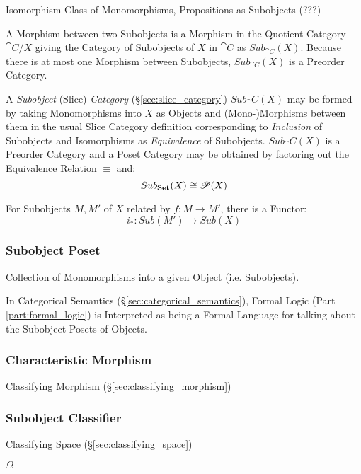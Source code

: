 Isomorphism Class of Monomorphisms, Propositions as Subobjects (???)

A Morphism between two Subobjects is a Morphism in the Quotient
Category $\cat{C}/X$ giving the Category of Subobjects of $X$ in
$\cat{C}$ as $Sub_{\cat{C}}(X)$. Because there is at most one
Morphism between Subobjects, $Sub_{\cat{C}}(X)$ is a Preorder
Category.

A \emph{Subobject} (Slice) \emph{Category}
(\S\ref{sec:slice_category}) $Sub_\cat{C}(X)$ may be formed by
taking Monomorphisms into $X$ as Objects and (Mono-)Morphisms between
them in the usual Slice Category definition corresponding to
\emph{Inclusion} of Subobjects and Isomorphisms as \emph{Equivalence}
of Subobjects. $Sub_\cat{C}(X)$ is a Preorder Category and a Poset
Category may be obtained by factoring out the Equivalence Relation
$\equiv$ and:
\[
  Sub_\mathbf{Set}(X) \cong \mathscr{P}(X)
\]

For Subobjects $M,M'$ of $X$ related by $f : M \rightarrow M'$, there
is a Functor:
\[
  i_* : Sub (M') \rightarrow Sub (X)
\]



\subsubsection{Subobject Poset}\label{sec:subobject_poset}

Collection of Monomorphisms into a given Object (i.e. Subobjects).

In Categorical Semantics (\S\ref{sec:categorical_semantics}), Formal
Logic (Part \ref{part:formal_logic}) is Interpreted as being a Formal
Language for talking about the Subobject Posets of Objects.



\subsubsection{Characteristic Morphism}
\label{sec:characteristic_morphism}

Classifying Morphism (\S\ref{sec:classifying_morphism})



\subsubsection{Subobject Classifier}\label{sec:subobject_classifier}

Classifying Space (\S\ref{sec:classifying_space})

$\Omega$

